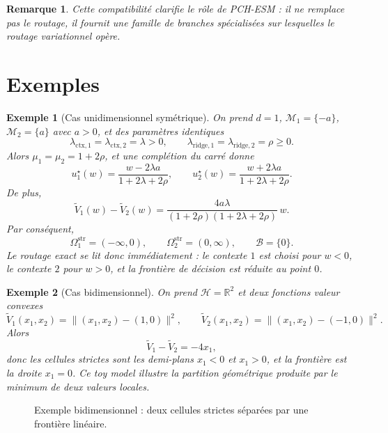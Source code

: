 \documentclass[11pt,a4paper]{article}
\newtheorem{remark}{Remarque}[section]
\newtheorem{example}{Exemple}[section]
\newcommand{\R}{\mathbb R}
\newcommand{\Hh}{\mathcal H}
\newcommand{\Mcal}{\mathcal M}
\newcommand{\Bcal}{\mathcal B}
\begin{document}
\begin{remark}
Cette compatibilité clarifie le rôle de PCH-ESM : il ne remplace pas le routage, il fournit une famille de branches spécialisées sur lesquelles le routage variationnel opère.
\end{remark}

\section{Exemples}

\begin{example}[Cas unidimensionnel symétrique]
On prend \(d=1\), \(\Mcal_1=\{-a\}\), \(\Mcal_2=\{a\}\) avec \(a>0\), et des paramètres identiques
\[
\lambda_{\mathrm{ctx},1}=\lambda_{\mathrm{ctx},2}=\lambda>0,
\qquad
\lambda_{\mathrm{ridge},1}=\lambda_{\mathrm{ridge},2}=\rho\ge 0.
\]
Alors \(\mu_1=\mu_2=1+2\rho\), et une complétion du carré donne
\[
u_1^\star(w)=\frac{w-2\lambda a}{1+2\lambda+2\rho},
\qquad
u_2^\star(w)=\frac{w+2\lambda a}{1+2\lambda+2\rho}.
\]
De plus,
\[
\widetilde V_1(w)-\widetilde V_2(w)
=
\frac{4a\lambda}{(1+2\rho)(1+2\lambda+2\rho)}\,w.
\]
Par conséquent,
\[
\Omega_1^{\mathrm{str}}=(-\infty,0),
\qquad
\Omega_2^{\mathrm{str}}=(0,\infty),
\qquad
\Bcal=\{0\}.
\]
Le routage exact se lit donc immédiatement : le contexte \(1\) est choisi pour \(w<0\), le contexte \(2\) pour \(w>0\), et la frontière de décision est réduite au point \(0\).
\end{example}

\begin{example}[Cas bidimensionnel]
On prend \(\Hh=\R^2\) et deux fonctions valeur convexes
\[
\widetilde V_1(x_1,x_2)=\|(x_1,x_2)-(1,0)\|^2,\qquad
\widetilde V_2(x_1,x_2)=\|(x_1,x_2)-(-1,0)\|^2.
\]
Alors
\[
\widetilde V_1-\widetilde V_2=-4x_1,
\]
donc les cellules strictes sont les demi-plans \(x_1<0\) et \(x_1>0\), et la frontière est la droite \(x_1=0\). Ce toy model illustre la partition géométrique produite par le minimum de deux valeurs locales.
\end{example}

\begin{figure}[ht]
\centering
{}
\caption{Exemple bidimensionnel : deux cellules strictes séparées par une frontière linéaire.}
\end{figure}
\end{document}
